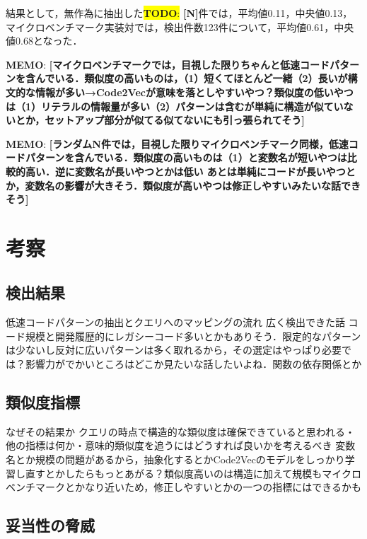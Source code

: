 \documentclass[submit,techrep,noauthor]{ipsj}
\newcommand{\todo}[1]{\colorbox{yellow}{{\bf TODO}:}{\color{red} {\textbf{[#1]}}}}
\newcommand{\memo}[1]{\colorbox{magenta!30}{{\bf MEMO}:}{\color{red!50} {\textbf{[#1]}}}}
\begin{document}
結果として，無作為に抽出した\todo{N}件では，平均値0.11，中央値0.13，マイクロベンチマーク実装対では，検出件数123件について，平均値0.61，中央値0.68となった．

\memo{マイクロベンチマークでは，目視した限りちゃんと低速コードパターンを含んでいる．類似度の高いものは，（1）短くてほとんど一緒（2）長いが構文的な情報が多い→Code2Vecが意味を落としやすいやつ？類似度の低いやつは（1）リテラルの情報量が多い（2）パターンは含むが単純に構造が似ていないとか，セットアップ部分が似てる似てないにも引っ張られてそう}

\memo{ランダムN件では，目視した限りマイクロベンチマーク同様，低速コードパターンを含んでいる．類似度の高いものは（1）と変数名が短いやつは比較的高い．逆に変数名が長いやつとかは低い あとは単純にコードが長いやつとか，変数名の影響が大きそう．類似度が高いやつは修正しやすいみたいな話できそう}


\section{考察}
\label{sec:discussion}


\subsection{検出結果}

低速コードパターンの抽出とクエリへのマッピングの流れ
広く検出できた話
コード規模と開発履歴的にレガシーコード多いとかもありそう．限定的なパターンは少ないし反対に広いパターンは多く取れるから，その選定はやっぱり必要では？影響力がでかいところはどこか見たいな話したいよね．関数の依存関係とか

\subsection{類似度指標}

なぜその結果か
クエリの時点で構造的な類似度は確保できていると思われる・他の指標は何か・意味的類似度を追うにはどうすれば良いかを考えるべき
変数名とか規模の問題があるから，抽象化するとかCode2Vecのモデルをしっかり学習し直すとかしたらもっとあがる？類似度高いのは構造に加えて規模もマイクロベンチマークとかなり近いため，修正しやすいとかの一つの指標にはできるかも

\subsection{妥当性の脅威}
\end{document}
